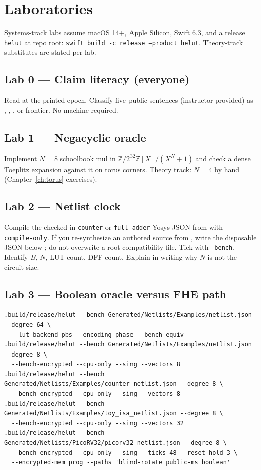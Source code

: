 \chapter{Laboratories}
\label{ch:lab}

Systems-track labs assume macOS 14$+$, Apple Silicon, Swift 6.3, and a
release \texttt{helut} at repo root:
\texttt{swift build -c release --product helut}.
Theory-track substitutes are stated per lab.

\section{Lab 0 --- Claim literacy (everyone)}

Read  at the printed epoch.
Classify five public sentences (instructor-provided) as , ,
, or frontier.
No machine required.

\section{Lab 1 --- Negacyclic oracle}

Implement $N=8$ schoolbook mul in $\mathbb{Z}/2^{32}\mathbb{Z}[X]/(X^N+1)$
and check a dense Toeplitz expansion against it on torus corners.
Theory track: $N=4$ by hand (Chapter~\ref{ch:torus} exercises).

\section{Lab 2 --- Netlist clock}

Compile the checked-in \texttt{counter} or \texttt{full\_adder} Yosys JSON
from  with \texttt{--compile-only}. If you re-synthesize an
authored source from , write the disposable JSON below
; do not overwrite a root compatibility file.
Tick with \texttt{--bench}. Identify $B$, $N$, LUT count, DFF count.
Explain in writing why $N$ is not the circuit size.

\section{Lab 3 --- Boolean oracle versus FHE path}

\begin{lstlisting}
.build/release/helut --bench Generated/Netlists/Examples/netlist.json --degree 64 \
  --lut-backend pbs --encoding phase --bench-equiv
.build/release/helut --bench Generated/Netlists/Examples/netlist.json --degree 8 \
  --bench-encrypted --cpu-only --sing --vectors 8
.build/release/helut --bench Generated/Netlists/Examples/counter_netlist.json --degree 8 \
  --bench-encrypted --cpu-only --sing --vectors 8
.build/release/helut --bench Generated/Netlists/Examples/toy_isa_netlist.json --degree 8 \
  --bench-encrypted --cpu-only --sing --vectors 32
.build/release/helut --bench Generated/Netlists/PicoRV32/picorv32_netlist.json --degree 8 \
  --bench-encrypted --cpu-only --sing --ticks 48 --reset-hold 3 \
  --encrypted-mem prog --paths 'blind-rotate public-ms boolean'
\end{lstlisting}

